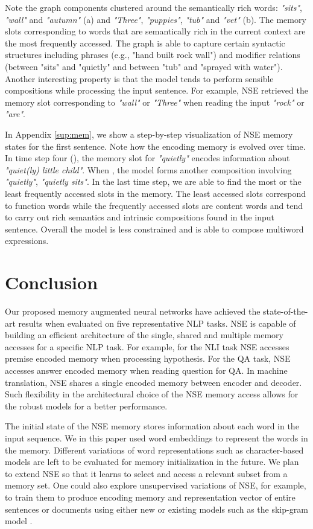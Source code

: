 \documentclass{article}
\begin{document}
Note the graph components clustered around the semantically rich words: \textit{"sits"}, \textit{"wall"} and \textit{"autumn"} (a) and \textit{"Three"}, \textit{"puppies"}, \textit{"tub"} and \textit{"vet"} (b). The memory slots corresponding to words that are semantically rich in the current context are the most frequently accessed. The graph is able to capture certain syntactic structures including phrases (e.g., "hand built rock wall") and modifier relations (between "sits" and "quietly" and between "tub" and "sprayed with water"). Another interesting property is that the model tends to perform sensible compositions while processing the input sentence. For example, NSE retrieved the memory slot corresponding to \textit{"wall"} or \textit{"Three"} when reading the input \textit{"rock"} or \textit{"are"}.

In Appendix \ref{sup:mem}, we show a step-by-step visualization of NSE memory states for the first sentence. Note how the encoding memory is evolved over time. In time step four (), the memory slot for \textit{"quietly"} encodes information about \textit{"quiet(ly) little child"}. When , the model forms another composition involving \textit{"quietly"}, \textit{"quietly sits"}. In the last time step, we are able to find the most or the least frequently accessed slots in the memory. The least accessed slots correspond to function words while the frequently accessed slots are content words and tend to carry out rich semantics and intrinsic compositions found in the input sentence. Overall the model is less constrained and is able to compose multiword expressions. 

\section{Conclusion}

Our proposed memory augmented neural networks have achieved the state-of-the-art results when evaluated on five representative NLP tasks. 
NSE is capable of building an efficient architecture of the single, shared and multiple memory accesses for a specific NLP task. 
For example, for the NLI task NSE accesses premise encoded memory when processing hypothesis. For the QA task, NSE accesses answer encoded memory when reading question for QA. In machine translation, NSE shares a single encoded memory between encoder and decoder. Such flexibility in the architectural choice of the NSE memory access allows for the robust models for a better performance. 


The initial state of the NSE memory stores information about each word in the input sequence. We in this paper used word embeddings to represent the words in the memory. Different variations of word representations such as character-based models are left to be evaluated for memory initialization in the future. We plan to extend NSE so that it learns to select and access a relevant subset from a memory set.
One could also explore unsupervised variations of NSE, for example, to train them to produce encoding memory and representation vector of entire sentences or documents using either new or existing models such as the skip-gram model \cite{mikolov:13}.
\end{document}
